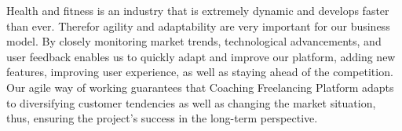 \documentclass[12pt]{report}
\begin{document}
Health and fitness is an industry that is extremely dynamic and develops faster than ever. Therefor agility and adaptability are very important for our business model. By closely monitoring market trends, technological advancements, and user feedback enables us to quickly adapt and improve our platform, adding new features, improving user experience, as well as staying ahead of the competition. Our agile way of working guarantees that Coaching Freelancing Platform adapts to diversifying customer tendencies as well as changing the market situation, thus, ensuring the project’s success in the long-term perspective.
\end{document}
